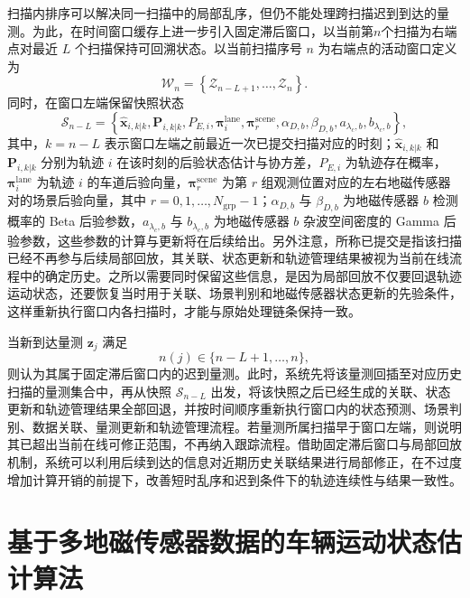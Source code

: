 \documentclass{xdupgthesis}
\begin{document}
扫描内排序可以解决同一扫描中的局部乱序，但仍不能处理跨扫描迟到到达的量测。为此，在时间窗口缓存上进一步引入固定滞后窗口，以当前第$n$个扫描为右端点对最近 $L$ 个扫描保持可回溯状态。以当前扫描序号 $n$ 为右端点的活动窗口定义为
\begin{equation}
	\mathcal W_n=
	\left\{
	\mathcal Z_{n-L+1},\ldots,\mathcal Z_n
	\right\}.
	\label{eq:ch3_lag_window}
\end{equation}
同时，在窗口左端保留快照状态
\begin{equation}
	\mathcal S_{n-L}=
	\left\{
	\hat{\mathbf x}_{i,k|k},\mathbf P_{i,k|k},P_{E,i},
	\boldsymbol\pi_i^{\mathrm{lane}},
	\boldsymbol\pi_r^{\mathrm{scene}},
	\alpha_{D,b},\beta_{D,b},a_{\lambda_c,b},b_{\lambda_c,b}
	\right\},
	\label{eq:ch3_snapshot_reorg}
\end{equation}
其中，$k=n-L$ 表示窗口左端之前最近一次已提交扫描对应的时刻；$\hat{\mathbf x}_{i,k|k}$ 和 $\mathbf P_{i,k|k}$ 分别为轨迹 $i$ 在该时刻的后验状态估计与协方差，$P_{E,i}$ 为轨迹存在概率，$\boldsymbol\pi_i^{\mathrm{lane}}$ 为轨迹 $i$ 的车道后验向量，$\boldsymbol\pi_r^{\mathrm{scene}}$ 为第 $r$ 组观测位置对应的左右地磁传感器对的场景后验向量，其中 $r=0,1,\ldots,N_{\mathrm{grp}}-1$；$\alpha_{D,b}$ 与 $\beta_{D,b}$ 为地磁传感器 $b$ 检测概率的 Beta 后验参数，$a_{\lambda_c,b}$ 与 $b_{\lambda_c,b}$ 为地磁传感器 $b$ 杂波空间密度的 Gamma 后验参数，这些参数的计算与更新将在后续给出。另外注意，所称已提交是指该扫描已经不再参与后续局部回放，其关联、状态更新和轨迹管理结果被视为当前在线流程中的确定历史。之所以需要同时保留这些信息，是因为局部回放不仅要回退轨迹运动状态，还要恢复当时用于关联、场景判别和地磁传感器状态更新的先验条件，这样重新执行窗口内各扫描时，才能与原始处理链条保持一致。

当新到达量测 $\mathbf z_j$ 满足
\begin{equation}
	n(j)\in\{n-L+1,\ldots,n\},
	\label{eq:ch3_late_condition}
\end{equation}
则认为其属于固定滞后窗口内的迟到量测。此时，系统先将该量测回插至对应历史扫描的量测集合中，再从快照 $\mathcal S_{n-L}$ 出发，将该快照之后已经生成的关联、状态更新和轨迹管理结果全部回退，并按时间顺序重新执行窗口内的状态预测、场景判别、数据关联、量测更新和轨迹管理流程。若量测所属扫描早于窗口左端，则说明其已超出当前在线可修正范围，不再纳入跟踪流程。借助固定滞后窗口与局部回放机制，系统可以利用后续到达的信息对近期历史关联结果进行局部修正，在不过度增加计算开销的前提下，改善短时乱序和迟到条件下的轨迹连续性与结果一致性。

\section{基于多地磁传感器数据的车辆运动状态估计算法}
\label{sec:ch3_state_estimation}
\end{document}

